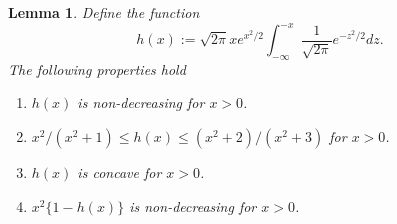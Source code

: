 \documentclass[12pt]{article}
\newtheorem{lemma}{Lemma}
\begin{document}
\begin{lemma}\label{lem:hfun}
Define the function
\begin{equation*}
    h(x) := \sqrt{2\pi} x e^{x^2/2} \int_{-\infty}^{-x} \frac{1}{\sqrt{2 \pi}} e^{-z^2/2}dz.
\end{equation*}
The following properties hold
\begin{enumerate}
    \item $h(x)$ is non-decreasing for $x>0$.
    \item $x^2 / (x^2 +1) \leq h(x) \leq (x^2 + 2) / (x^2 + 3)$ for $x > 0$.
    \item $h(x)$ is concave for $x > 0$.
    \item $x^2\{1 - h(x)\}$ is non-decreasing for $x>0$.
\end{enumerate}
\end{lemma}
\end{document}

